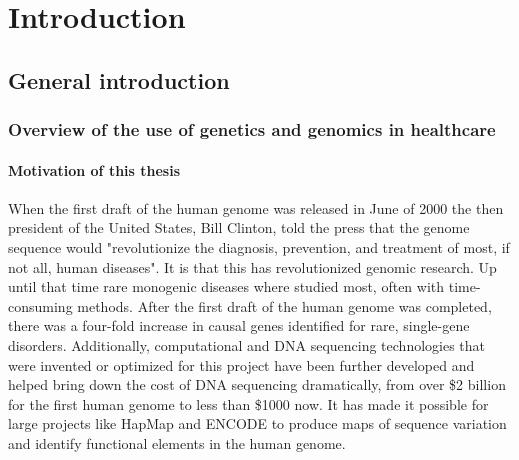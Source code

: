 \chapter{Introduction}
\label{chap:introduction}

{ \Large {} }

\newpage

\noindent

\section{General introduction}
\subsection{Overview of the use of genetics and genomics in healthcare}
\subsubsection{Motivation of this thesis}
When the first draft of the human genome was released in June of 2000 the then president of the United States, Bill Clinton, told the press that the genome sequence would "revolutionize the diagnosis, prevention, and treatment of most, if not all, human diseases".\cite{collinsHasRevolutionArrived2010a} It is that this has revolutionized genomic research. Up until that time rare monogenic diseases where studied most, often with time-consuming methods. After the first draft of the human genome was completed, there was a four-fold increase in causal genes identified for rare, single-gene disorders. \cite{claussnitzerBriefHistoryHuman2020b} Additionally, computational and DNA sequencing technologies that were invented or optimized for this project\cite{hoodHumanGenomeProject2013} have been further developed and helped bring down the cost of DNA sequencing dramatically, from over \$2 billion for the first human genome to less than \$1000 now. It has made it possible for large projects like HapMap\cite{InternationalHapMapProject2003} and ENCODE\cite{consortiumENCODEENCyclopediaDNA2004} to produce maps of sequence variation and identify functional elements in the human genome. \\

